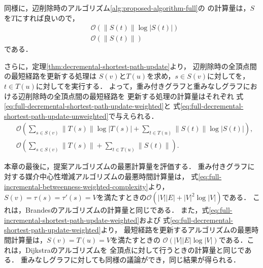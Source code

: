 同様に，辺削除時のアルゴリズム\ref{alg:proposed-algorithm-full}の
の計算量は，$S$を$T$にすれば良いので，
\begin{equation*}
  \begin{aligned}
    &\mathcal{O}\left(\|S(t)\|\log|S(t)|\right) \\
    &\mathcal{O}\left(\|S(t)\|\right)
  \end{aligned}
\end{equation*}
である．

さらに，定理\ref{thm:decremental-shortest-path-update}より，
辺削除時の全頂点間の最短経路を更新する処理は
$S(v)$と$T(u)$を求め，$s\in S(v)$に対してを，
$t\in T(u)$に対してを実行する．
よって，重み付きグラフと重みなしグラフにおける辺削除時の全頂点間の最短経路を
更新する処理の計算量はそれぞれ
式\eqref{eq:full-decremental-shortest-path-update-weighted}と
式\eqref{eq:full-decremental-shortest-path-update-unweighted}で与えられる．
\begin{align}
  &\mathcal{O}\left(\sum_{s\in S(v)}\|T(s)\|\log|T(s)|+\sum_{t\in T(u)}\|S(t)\|\log|S(t)|\right),
  \label{eq:full-decremental-shortest-path-update-weighted} \\
  &\mathcal{O}\left(\sum_{s\in S(v)}\|T(s)\|+\sum_{t\in T(u)}\|S(t)\|\right).
  \label{eq:full-decremental-shortest-path-update-unweighted}
\end{align}

本章の最後に，提案アルゴリズムの最悪計算量を評価する．
重み付きグラフに対する媒介中心性増減アルゴリズムの最悪時間計算量は，
式\eqref{eq:full-incremental-betweenness-weighted-complexity}より，
$S(v)=\tau(s)=\tau'(s)=V$を満たすときの$\mathcal{O}(|V||E|+|V|^2\log|V|)$である．
これは，Brandesのアルゴリズムの計算量と同じである．
また，式\eqref{eq:full-incremental-shortest-path-update-weighted}および
式\eqref{eq:full-decremental-shortest-path-update-weighted}より，
最短経路を更新するアルゴリズムの最悪時間計算量は，$S(v)=T(u)=V$を満たすときの
$\mathcal{O}(|V||E|\log|V|)$である．これは，Dijkstraのアルゴリズムを
全頂点に対して行うときの計算量と同じである．
重みなしグラフに対しても同様の議論ができ，同じ結果が得られる．

